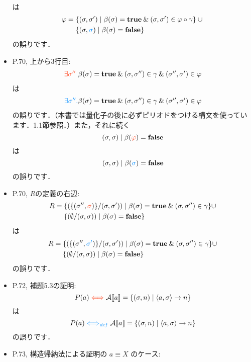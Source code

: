\documentclass[12pt,titlepage,twoside,openright,dvipdfmx]{jsbook}
\newcommand\old[1]{%
  \textcolor[rgb]{1.0,0.25,0.1}{#1}%
  }
\newcommand\new[1]{%
  \textcolor[rgb]{0,0.55,1.0}{#1}%
  }
\theoremstyle{definition}
\begin{document}
\begin{itemize}
\begin{align*}
  \end{align*}
  は
  \begin{align*}
    \varphi = {} & \{(\sigma,\sigma')\mid \beta(\sigma)=\mathbf{true} \AND
                   (\sigma,\sigma')\in \varphi\circ\gamma \} \cup {} \\
                 & \{(\sigma,\new{\sigma})\mid \beta(\sigma)=\mathbf{false} \}
  \end{align*}
  の誤りです．
\item P.70, 上から3行目:
  \[
    \begin{array}{l}
      \old{\exists{\sigma''}\ }\beta(\sigma)=\mathbf{true}\AND
      (\sigma,\sigma'')\in\gamma \AND
      (\sigma'',\sigma')\in\varphi
    \end{array}
  \]
  は
  \[
    \begin{array}{l}
      \new{\exists{\sigma''}. }\beta(\sigma)=\mathbf{true}\AND
      (\sigma,\sigma'')\in\gamma \AND
      (\sigma'',\sigma')\in\varphi
    \end{array}
  \]
  の誤りです．（本書では量化子の後に必ずピリオドをつける構文を使ってい
  ます．1.1節参照．）また，それに続く
  \[
    (\sigma,\sigma)\mid  \beta(\old{\varphi})=\mathbf{false}
  \]
  は
  \[
    (\sigma,\sigma)\mid  \beta(\new{\sigma})=\mathbf{false}
  \]
  の誤りです．
\item P.70, $R$の定義の右辺:
  \begin{align*}
    R = {} &\{(\{(\sigma'',\old{\sigma})\}/(\sigma,\sigma'))\mid
             \beta(\sigma)=\mathbf{true}\AND
             (\sigma,\sigma'')\in\gamma \} \cup \\
           &\{(\emptyset/(\sigma,\sigma))\mid \beta(\sigma)=\mathbf{false}\}
  \end{align*}
  は
  \begin{align*}
    R = {} &\{(\{(\sigma'',\new{\sigma'})\}/(\sigma,\sigma'))\mid
             \beta(\sigma)=\mathbf{true}\AND
             (\sigma,\sigma'')\in\gamma \} \cup \\
           &\{(\emptyset/(\sigma,\sigma))\mid \beta(\sigma)=\mathbf{false}\}
  \end{align*}
  の誤りです．
\item P.72, 補題5.3の証明:
  \[
    P(a)\old{{} \Longleftrightarrow {}}
    \denotation{A}{a}=\{ (\sigma,n) \mid   \tuple{a,\sigma}\rightarrow n\}
  \]
  は
  \[
    P(a)\new{{} \Longleftrightarrow_{\mathit{def}} {}}
    \denotation{A}{a}=\{ (\sigma,n) \mid   \tuple{a,\sigma}\rightarrow n\}
  \]
  の誤りです．
\item P.73, 構造帰納法による証明の $a \equiv X$ のケース:

\end{itemize}
\end{document}
